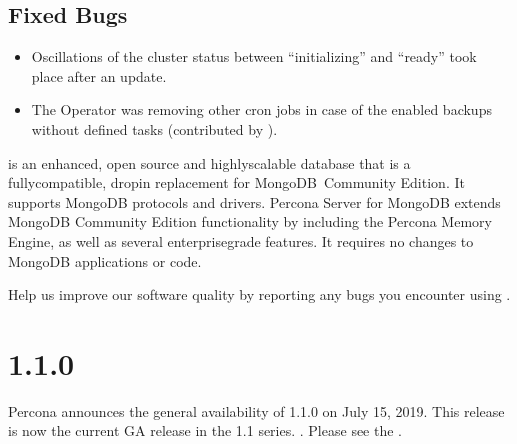 \documentclass[letterpaper,10pt,english]{sphinxmanual}
\begin{document}
\subsection{Fixed Bugs}
\label{\detokenize{RN/Kubernetes-Operator-for-PSMONGODB-RN1.2.0:fixed-bugs}}\begin{itemize}
\item {} 
Oscillations of the cluster status between “initializing” and “ready” took
place after an update.

\item {} 
The Operator was removing other cron jobs in case of the enabled backups
without defined tasks (contributed by ).

\end{itemize}

is an enhanced, open source and highly\sphinxhyphen{}scalable database that is a
fully\sphinxhyphen{}compatible, drop\sphinxhyphen{}in replacement for MongoDB Community Edition. It supports
MongoDB protocols and drivers. Percona Server for MongoDB extends MongoDB
Community Edition functionality by including the Percona Memory Engine, as well
as several enterprise\sphinxhyphen{}grade features. It requires no changes to MongoDB
applications or code.

Help us improve our software quality by reporting any bugs you encounter using
.


\section{ 1.1.0}
\label{\detokenize{RN/Kubernetes-Operator-for-PSMONGODB-RN1.1.0:percona-kubernetes-operator-for-percona-server-for-mongodb-1-1-0}}\label{\detokenize{RN/Kubernetes-Operator-for-PSMONGODB-RN1.1.0::doc}}
Percona announces the general availability of  1.1.0 on July 15, 2019. This release is now the current GA release in the 1.1 series. . Please see the .
\end{document}
